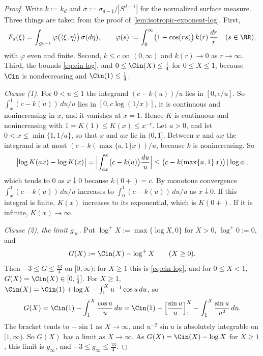 \begin{proof}
\leanok
Write $k := k_d$ and $\bar\sigma := \sigma_{d-1}/|S^{d-1}|$ for the normalized surface measure.
Three things are taken from the proof of \ref{lem:isotropic-exponent-log}. First,
\[
  F_d(\xi) = \int_{S^{d-1}}\varphi\bigl(\langle\xi,\eta\rangle\bigr)\,\bar\sigma(d\eta),
  \qquad
  \varphi(s) := \int_0^\infty\bigl(1 - \cos(rs)\bigr)\,k(r)\,\frac{dr}{r} \quad (s \in \RR),
\]
with $\varphi$ even and finite. Second, $k \le c$ on $(0,\infty)$ and $k(r) \to 0$ as
$r \to \infty$. Third, the bounds \ref{eq:cin-log}, and $0 \le \Cin(X) \le \tfrac14$ for
$0 \le X \le 1$, because $\Cin$ is nondecreasing and $\Cin(1) \le \tfrac14$.

\emph{Clause (1).} For $0 < u \le 1$ the integrand $(c - k(u))/u$ lies in $[0, c/u]$. So
$\int_x^1 (c - k(u))\,du/u$ lies in $[0, c\log(1/x)]$, it is continuous and nonincreasing in $x$,
and it vanishes at $x = 1$. Hence $K$ is continuous and nonincreasing with
$1 = K(1) \le K(x) \le x^{-c}$. Let $a > 0$, and let $0 < x \le \min\{1, 1/a\}$, so that $x$ and
$ax$ lie in $(0,1]$. Between $x$ and $ax$ the integrand is at most $(c - k(\max\{a,1\}x))/u$,
because $k$ is nonincreasing. So
\[
  \bigl|\log K(ax) - \log K(x)\bigr| = \Bigl|\int_{ax}^{x}\bigl(c - k(u)\bigr)\frac{du}{u}\Bigr|
   \le \bigl(c - k(\max\{a,1\}\,x)\bigr)\,|\log a| ,
\]
which tends to $0$ as $x \downarrow 0$ because $k(0{+}) = c$. By monotone convergence
$\int_x^1 (c - k(u))\,du/u$ increases to $\int_0^1 (c - k(u))\,du/u$ as $x \downarrow 0$. If this
integral is finite, $K(x)$ increases to its exponential, which is $K(0{+})$. If it is infinite,
$K(x) \to \infty$.

\emph{Clause (2), the limit $g_\infty$.} Put $\log^+ X := \max\{\log X, 0\}$ for $X > 0$,
$\log^+ 0 := 0$, and
\[
  G(X) := \Cin(X) - \log^+ X \qquad (X \ge 0) .
\]
Then $-3 \le G \le \tfrac{13}{4}$ on $[0,\infty)$: for $X \ge 1$ this is \ref{eq:cin-log}, and for
$0 \le X < 1$, $G(X) = \Cin(X) \in [0,\tfrac14]$. For $X \ge 1$,
$\Cin(X) = \Cin(1) + \log X - \int_1^X u^{-1}\cos u\,du$, so
\[
  G(X) = \Cin(1) - \int_1^X \frac{\cos u}{u}\,du
       = \Cin(1) - \Bigl[\frac{\sin u}{u}\Bigr]_1^X - \int_1^X \frac{\sin u}{u^2}\,du .
\]
The bracket tends to $-\sin 1$ as $X \to \infty$, and $u^{-2}\sin u$ is absolutely integrable on
$[1,\infty)$. So $G(X)$ has a limit as $X \to \infty$. As $G(X) = \Cin(X) - \log X$ for $X \ge 1$,
this limit is $g_\infty$, and $-3 \le g_\infty \le \tfrac{13}{4}$.


\end{proof}
